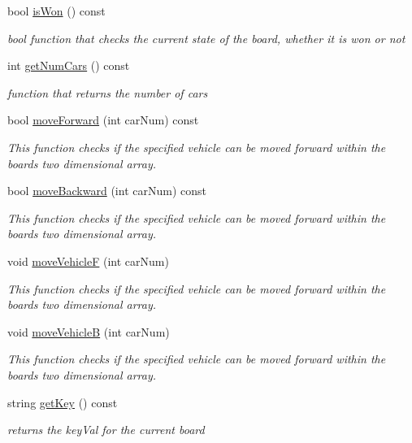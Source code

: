 \begin{DoxyCompactItemize}
bool \hyperlink{class_board_a13b97126e30f1919ff6422969dd718ca}{is\+Won} () const 
\begin{DoxyCompactList}\small\item\em bool function that checks the current state of the board, whether it is won or not \end{DoxyCompactList}\item 
int \hyperlink{class_board_ac6a88cf5d91ddcf9f60bcd2cbc13d1b5}{get\+Num\+Cars} () const 
\begin{DoxyCompactList}\small\item\em function that returns the number of cars \end{DoxyCompactList}\item 
bool \hyperlink{class_board_aaccba9b598e3263ce0f847905c7932f7}{move\+Forward} (int car\+Num) const 
\begin{DoxyCompactList}\small\item\em This function checks if the specified vehicle can be moved forward within the board\textquotesingle{}s two dimensional array. \end{DoxyCompactList}\item 
bool \hyperlink{class_board_a5e28f45b57feda8b5923abddfecb239f}{move\+Backward} (int car\+Num) const 
\begin{DoxyCompactList}\small\item\em This function checks if the specified vehicle can be moved forward within the board\textquotesingle{}s two dimensional array. \end{DoxyCompactList}\item 
void \hyperlink{class_board_acb31ee668b7da4f505e9eefa7106a247}{move\+VehicleF} (int car\+Num)
\begin{DoxyCompactList}\small\item\em This function checks if the specified vehicle can be moved forward within the board\textquotesingle{}s two dimensional array. \end{DoxyCompactList}\item 
void \hyperlink{class_board_aafad681795230d9764ad1bf5e3b3548f}{move\+VehicleB} (int car\+Num)
\begin{DoxyCompactList}\small\item\em This function checks if the specified vehicle can be moved forward within the board\textquotesingle{}s two dimensional array. \end{DoxyCompactList}\item 
string \hyperlink{class_board_a64f3541935062c9084dc010be11c5b77}{get\+Key} () const 
\begin{DoxyCompactList}\small\item\em returns the key\+Val for the current board \end{DoxyCompactList}\end{DoxyCompactItemize}


